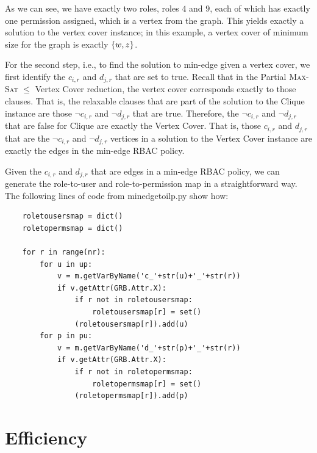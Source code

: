 \documentclass[11pt,onecolumn]{article}
\newcommand{\set}[1]{\ensuremath{\left\{#1\right\}}\xspace}
\let\originalleft\left
\let\originalright\right
\renewcommand{\left}{\mathopen{}\mathclose\bgroup\originalleft}
\renewcommand{\right}{\aftergroup\egroup\originalright}
\begin{document}
\vspace*{0.125in}
\noindent
As we can see, we have exactly two roles, roles $4$ and $9$, each of which has exactly one permission assigned, which is a vertex from the graph. This yields exactly a solution to the vertex cover instance; in this example, a vertex cover of minimum size for the graph is exactly $\set{w, z}$.

\vspace*{0.125in}
\noindent
For the second step, i.e., to find the solution to min-edge given a vertex cover, we first identify the $c_{i,r}$ and $d_{j,r}$ that are set to true. Recall that in the Partial \textsc{Max-Sat} $\le$ Vertex Cover reduction, the vertex cover corresponds exactly to those clauses. That is, the relaxable clauses that are part of the solution to the Clique instance are those $\neg c_{i,r}$ and $\neg d_{j,r}$ that are true. Therefore, the $\neg c_{i,r}$ and $\neg d_{j,r}$ that are false for Clique are exactly the Vertex Cover. That is, those $c_{i,r}$ and $d_{j,r}$ that are the $\neg c_{i,r}$ and $\neg d_{j,r}$ vertices in a solution to the Vertex Cover instance are exactly the edges in the min-edge RBAC policy.

\vspace*{0.125in}
\noindent
Given the $c_{i,r}$ and $d_{j,r}$ that are edges in a min-edge RBAC policy, we can generate the role-to-user and role-to-permission map in a straightforward way. The following lines of code from \textsf{minedgetoilp.py} show how:

\hspace*{0.5in}
\begin{minipage}{0.95\linewidth}
\begin{lstlisting}
    roletousersmap = dict()
    roletopermsmap = dict()

    for r in range(nr):
        for u in up:
            v = m.getVarByName('c_'+str(u)+'_'+str(r))
            if v.getAttr(GRB.Attr.X):
                if r not in roletousersmap:
                    roletousersmap[r] = set()
                (roletousersmap[r]).add(u)
        for p in pu:
            v = m.getVarByName('d_'+str(p)+'_'+str(r))
            if v.getAttr(GRB.Attr.X):
                if r not in roletopermsmap:
                    roletopermsmap[r] = set()
                (roletopermsmap[r]).add(p)
\end{lstlisting}
\end{minipage}

\section*{Efficiency}
\end{document}
